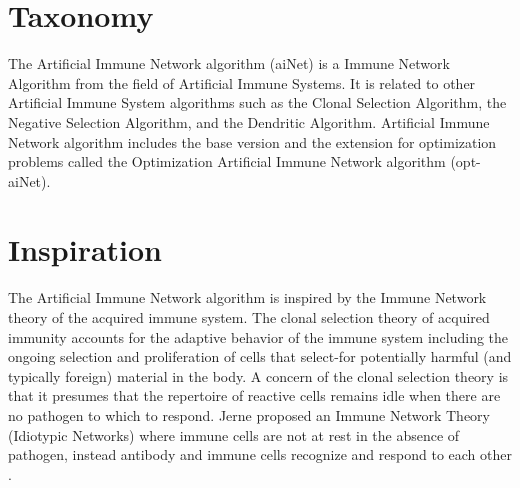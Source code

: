 \documentclass[a4paper, 11pt]{article}
\begin{document}
\section{Taxonomy}
\label{sec:taxonomy}
The Artificial Immune Network algorithm (aiNet) is a Immune Network Algorithm from the field of Artificial Immune Systems.
It is related to other Artificial Immune System algorithms such as the Clonal Selection Algorithm, the Negative Selection Algorithm, and the Dendritic Algorithm.
Artificial Immune Network algorithm includes the base version and the extension for optimization problems called the Optimization Artificial Immune Network algorithm (opt-aiNet).

\section{Inspiration}
\label{sec:inspiration}
The Artificial Immune Network algorithm is inspired by the Immune Network theory of the acquired immune system.
The clonal selection theory of acquired immunity accounts for the adaptive behavior of the immune system including the ongoing selection and proliferation of cells that select-for potentially harmful (and typically foreign) material in the body.
A concern of the clonal selection theory is that it presumes that the repertoire of reactive cells remains idle when there are no pathogen to which to respond. Jerne proposed an Immune Network Theory (Idiotypic Networks) where immune cells are not at rest in the absence of pathogen, instead antibody and immune cells recognize and respond to each other \cite{Jerne1974, Jerne1974a, Jerne1984}. 
\end{document}
